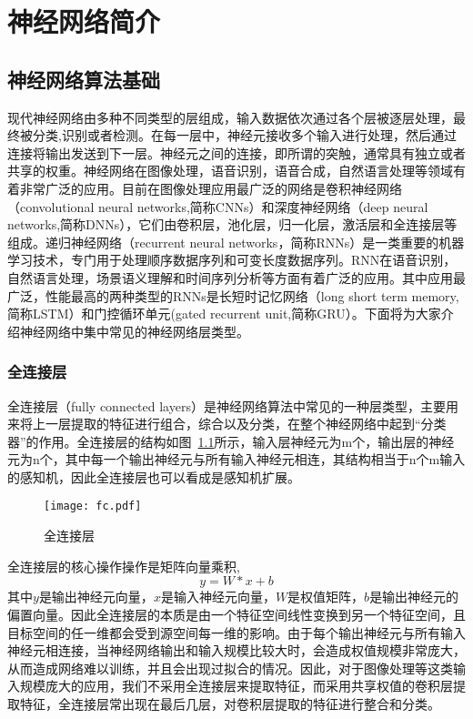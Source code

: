 \chapter{神经网络简介}


\section{神经网络算法基础}
现代神经网络由多种不同类型的层组成，输入数据依次通过各个层被逐层处理，最终被分类,识别或者检测。在每一层中，神经元接收多个输入进行处理，然后通过连接将输出发送到下一层。神经元之间的连接，即所谓的突触，通常具有独立或者共享的权重。神经网络在图像处理，语音识别，语音合成，自然语言处理等领域有着非常广泛的应用。目前在图像处理应用最广泛的网络是卷积神经网络（convolutional neural networks,简称CNNs）和深度神经网络（deep neural networks,简称DNNs），它们由卷积层，池化层，归一化层，激活层和全连接层等组成。递归神经网络（recurrent neural networks，简称RNNs）是一类重要的机器学习技术，专门用于处理顺序数据序列和可变长度数据序列。RNN在语音识别，自然语言处理，场景语义理解和时间序列分析等方面有着广泛的应用。其中应用最广泛，性能最高的两种类型的RNNs是长短时记忆网络（long short term memory,简称LSTM）和门控循环单元(gated recurrent unit,简称GRU）。下面将为大家介绍神经网络中集中常见的神经网络层类型。

\subsection{全连接层}
全连接层（fully connected layers）是神经网络算法中常见的一种层类型，主要用来将上一层提取的特征进行组合，综合以及分类，在整个神经网络中起到“分类器”的作用。全连接层的结构如图~\ref{fig:fc_layer}所示，输入层神经元为m个，输出层的神经元为n个，其中每一个输出神经元与所有输入神经元相连，其结构相当于n个m输入的感知机，因此全连接层也可以看成是感知机扩展。 
\begin{figure}
  \centering
  \texttt{[image: fc.pdf]}
  \caption{\footnotesize 全连接层}
  \label{fig:fc_layer}
\end{figure}


全连接层的核心操作操作是矩阵向量乘积,
\begin{equation}
y=W*x+b
\end{equation}
其中$y$是输出神经元向量，$x$是输入神经元向量，$W$是权值矩阵，$b$是输出神经元的偏置向量。因此全连接层的本质是由一个特征空间线性变换到另一个特征空间，且目标空间的任一维都会受到源空间每一维的影响。由于每个输出神经元与所有输入神经元相连接，当神经网络输出和输入规模比较大时，会造成权值规模非常庞大，从而造成网络难以训练，并且会出现过拟合的情况。因此，对于图像处理等这类输入规模庞大的应用，我们不采用全连接层来提取特征，而采用共享权值的卷积层提取特征，全连接层常出现在最后几层，对卷积层提取的特征进行整合和分类。

